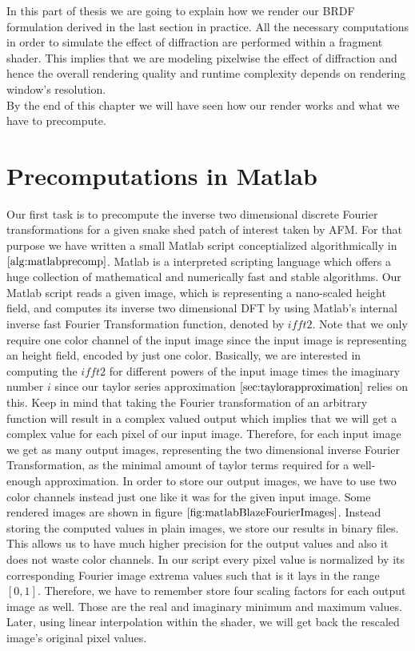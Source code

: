 In this part of thesis we are going to explain how we render our BRDF formulation derived in the last section in practice. All the necessary computations in order to simulate the effect of diffraction are performed within a fragment shader. This implies that we are modeling pixelwise the effect of diffraction and hence the overall rendering quality and runtime complexity depends on rendering window's resolution. \\

By the end of this chapter we will have seen how our render works and what we have to precompute. 

\section{Precomputations in Matlab}
\label{sec:precompmatlabfourierimages}
Our first task is to precompute the inverse two dimensional discrete Fourier transformations for a given snake shed patch of interest taken by AFM. For that purpose we have written a small Matlab script conceptialized algorithmically in $\ref{alg:matlabprecomp}$. Matlab is a interpreted scripting language which offers a huge collection of mathematical and numerically fast and stable algorithms. Our Matlab script reads a given image, which is representing a nano-scaled height field, and computes its inverse two dimensional DFT by using Matlab's internal inverse fast Fourier Transformation function, denoted by $ifft2$. Note that we only require one color channel of the input image since the input image is representing an height field, encoded by just one color. Basically, we are interested in computing the $ifft2$ for different powers of the input image times the imaginary number $i$ since our taylor series approximation $\ref{sec:taylorapproximation}$ relies on this. Keep in mind that taking the Fourier transformation of an arbitrary function will result in a complex valued output which implies that we will get a complex value for each pixel of our input image. Therefore, for each input image we get as many output images, representing the two dimensional inverse Fourier Transformation, as the minimal amount of taylor terms required for a well-enough approximation. In order to store our output images, we have to use two color channels instead just one like it was for the given input image. Some rendered images are shown in figure $\ref{fig:matlabBlazeFourierImages}$. Instead storing the computed values in plain images, we store our results in binary files. This allows us to have much higher precision for the output values and also it does not waste color channels. In our script every pixel value is normalized by its corresponding Fourier image extrema values such that is it lays in the range $\left[0,1\right]$. Therefore, we have to remember store four scaling factors for each output image as well. Those are the real and imaginary minimum and maximum values. Later, using linear interpolation within the shader, we will get back the rescaled image's original pixel values. 

